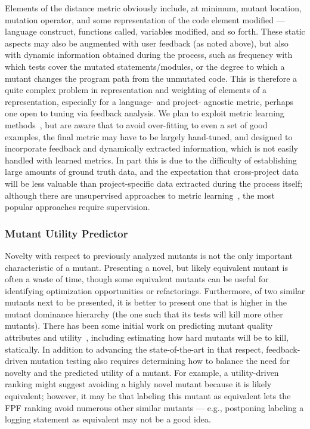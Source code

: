 Elements of the
distance metric obviously include, at minimum, mutant location, mutation operator, and
some representation of the code element modified --- language
construct, functions called, variables modified, and so forth.  These
static aspects may also be augmented with user feedback (as noted
above), but also with dynamic information obtained during the process,
such as frequency with which tests cover the mutated
statements/modules, or the degree to which a mutant changes the
program path from the unmutated code.
This is therefore a quite complex problem in representation and weighting of elements of a
representation, especially for a language- and
project- agnostic metric, perhaps one open to tuning via feedback
analysis.  We plan to exploit metric learning
methods~\cite{kulis2012metric}, but are aware that to avoid over-fitting
to even a set of good examples, the final metric may have to be largely
hand-tuned, and designed to incorporate feedback and dynamically
extracted information, which is not easily handled with learned metrics.  In part this is due to the difficulty of establishing
large amounts of ground truth data, and the expectation that
cross-project data will be less valuable than project-specific data
extracted during the process itself; although there are unsupervised
approaches to metric learning~\cite{scholkopf1998nonlinear,tipping1999probabilistic}, the most popular approaches require supervision.

\subsubsection{Mutant Utility Predictor}

Novelty with respect to previously analyzed mutants is not the only
important characteristic of a mutant.  Presenting a novel, but likely
equivalent mutant is often a waste of time, though some equivalent
mutants can be useful for identifying optimization opportunities or
refactorings.  Furthermore, of two similar mutants next to be presented,
it is better to present one that is higher in the mutant dominance
hierarchy (the one such that its tests will kill more other mutants).
There has been some initial work on predicting mutant quality
attributes and utility~\cite{MutQuality,FaRM}, including estimating how hard mutants
will be to kill, statically.  In addition to advancing the
state-of-the-art in that respect, feedback-driven mutation testing
also requires determining how to balance the need for novelty and the
predicted utility of a mutant.  For example, a utility-driven ranking
might suggest avoiding a highly novel mutant because it is likely
equivalent; however, it may be that labeling this mutant as equivalent
lets the FPF ranking avoid numerous other similar mutants --- e.g.,
postponing labeling a logging statement as equivalent may not be a
good idea.

